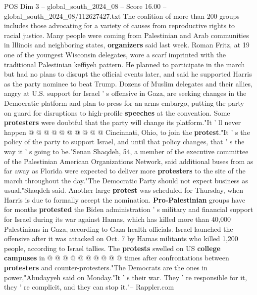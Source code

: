 \begin{textsample}{POS Dim 3 – global\_south\_2024\_08 – Score 16.00 – global\_south\_2024\_08/112627427.txt}
The coalition of more than 200 groups includes those advocating for a variety of causes from reproductive rights to racial justice.
Many people were coming from Palestinian and Arab communities in Illinois and neighboring states, \textbf{organizers} said last week.
Roman Fritz, at 19 one of the youngest Wisconsin delegates, wore a scarf imprinted with the traditional Palestinian keffiyeh pattern.
He planned to participate in the march but had no plans to disrupt the official events later, and said he supported Harris as the party nominee to beat Trump.
Dozens of Muslim delegates and their allies, angry at U.S. support for Israel ' s offensive in Gaza, are seeking changes in the Democratic platform and plan to press for an arms embargo, putting the party on guard for disruptions to high-profile \textbf{speeches} at the convention.
Some \textbf{protesters} were doubtful that the party will change its platform."It ' ll never happen @ @ @ @ @ @ @ @ @ @ Cincinnati, Ohio, to join the \textbf{protest}."It ' s the policy of the party to support Israel, and until that policy changes, that ' s the way it ' s going to be."Senan Shaqdeh, 54, a member of the executive committee of the Palestinian American Organizations Network, said additional buses from as far away as Florida were expected to deliver more \textbf{protesters} to the site of the march throughout the day."The Democratic Party should not expect business as usual,"Shaqdeh said.
Another large \textbf{protest} was scheduled for Thursday, when Harris is due to formally accept the nomination. \textbf{Pro-Palestinian} groups have for months \textbf{protested} the Biden administration ' s military and financial support for Israel during its war against Hamas, which has killed more than 40,000 Palestinians in Gaza, according to Gaza health officials.
Israel launched the offensive after it was attacked on Oct. 7 by Hamas militants who killed 1,200 people, according to Israel tallies.
The \textbf{protests} swelled on US \textbf{college} \textbf{campuses} in @ @ @ @ @ @ @ @ @ @ times after confrontations between \textbf{protesters} and counter-protesters."The Democrats are the ones in power,"Abudayyeh said on Monday."It ' s their war.
They ' re responsible for it, they ' re complicit, and they can stop it."-- Rappler.com

\end{textsample}

